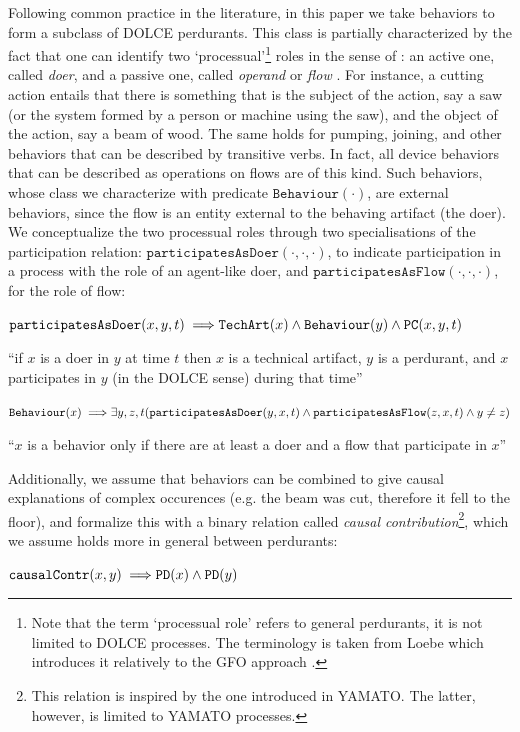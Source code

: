 \documentclass[sw]{iosart2x}
\newcommand{\bflist}{\begin{list}{}{\setlength{\topsep}{2mm}\setlength{\partopsep}{0mm}\setlength{\parsep}{0mm}\setlength{\leftmargin}{9mm}\setlength{\labelwidth}{8mm}}}
\newcommand{\eflist}{\end{list}}
\newcommand{\AxLabel}{\textrm{a}}
\newcounter{cntax}
\newcommand{\myax}[1]{\refstepcounter{cntax}\begin{small}{\bf \AxLabel\thecntax\label{ax:#1}}\end{small}}
\newcommand{\mytext}[1]{``#1''}
\newcommand{\generalStyle}[1]{\texttt{#1}}
\newcommand{\biRel}[3]{\generalStyle{#1}(#2,#3)}
\newcommand{\uniRel}[2]{\generalStyle{#1}(#2)}
\newcommand{\triRel}[4]{\generalStyle{#1}(#2,#3,#4)}
\newcommand{\myfi}{\hspace{0.9mm} \Longrightarrow}
\newcommand{\DOLCE}{\textsc{DOLCE}\xspace} %
\newcommand{\YAMATO}{\textsc{YAMATO}\xspace}
\newcommand{\DOLCEPerdurant}[1]{\uniRel{{PD}}{#1}}
\newcommand{\DOLCEPC}[3]{\triRel{{PC}}{#1}{#2}{#3}}
\newcommand{\TechArt}[1]{\uniRel{TechArt}{#1}}
\newcommand{\BehaviourConcrete}[1]{\uniRel{Behaviour}{#1}}
\newcommand{\causallyContr}[2]{\biRel{causalContr}{#1}{#2}}
\newcommand{\participateAsDoer}[3]{\triRel{participatesAsDoer}{#1}{#2}{#3}}
\newcommand{\participateAsFlow}[3]{\triRel{participatesAsFlow}{#1}{#2}{#3}}
\newcommand{\firstTimeKeyWord}[1]{\textit{#1}}
\newcommand{\quotes}[1]{`#1'}
\begin{document}
Following common practice in the literature, in this paper we take behaviors to form a subclass of \DOLCE perdurants. This class is partially characterized by the fact that one can identify two `processual'\footnote{Note that the term \quotes{processual role} refers to general perdurants, it is not limited to \DOLCE processes. The terminology is taken from Loebe which introduces it relatively to the GFO approach \cite{loebeAbstractVsSocial2007}.} roles in the sense of \cite{loebeAbstractVsSocial2007}: an active one, called \firstTimeKeyWord{doer}, and a passive one, called \firstTimeKeyWord{operand} or \firstTimeKeyWord{flow} \cite{pahl_engineering_2007}. 
For instance, a cutting action entails that there is something that is the subject of the action, say a saw (or the system formed by a person or machine using the saw), and the object of the action, say a beam of wood.
The same holds for pumping, joining, and other behaviors that can be described by transitive verbs. 
In fact, all device behaviors that can be described as operations on flows are of this kind. 
Such behaviors, whose class we characterize with predicate $\BehaviourConcrete{\cdot}$, are external behaviors, since the flow is an entity external to the behaving artifact (the doer).
We conceptualize the two processual roles through two specialisations of the participation relation: $\participateAsDoer{\cdot}{\cdot}{\cdot}$, to indicate participation in a process with the role of an agent-like doer, and $\participateAsFlow{\cdot}{\cdot}{\cdot}$, for the role of flow: 
\bflist
  \item[\myax{participateAsDoerRage}]  $ \participateAsDoer{x}{y}{t} \myfi \TechArt{x} \land \BehaviourConcrete{y} \land \DOLCEPC{x}{y}{t}$
\item \mytext{if $x$ is a doer in $y$ at time $t$ then $x$ is a technical artifact, $y$ is a perdurant, and $x$ participates in $y$ (in the \DOLCE sense) during that time}
  \item[\myax{processualRoles}] $ \BehaviourConcrete{x} \myfi \exists y,z,t(\participateAsDoer{y}{x}{t} \land \participateAsFlow{z}{x}{t} \land y \neq z) $ 
\item \mytext{$x$ is a behavior only if there are at least a doer and a flow that participate in $x$}
\eflist

Additionally, we assume that behaviors can be combined to give causal explanations of complex occurences (e.g. the beam was cut, therefore it fell to the floor), and formalize this with a binary relation called \firstTimeKeyWord{causal contribution}\footnote{This relation is inspired by the one introduced in \YAMATO \cite{mizoguchiYAMATOAnotherMore}. The latter, however, is limited to \YAMATO processes.}, which we assume holds more in general between perdurants:
\bflist
  \item[\myax{contribRange}] $ \causallyContr{x}{y} \myfi \DOLCEPerdurant{x} \land \DOLCEPerdurant{y} $
\eflist
\end{document}
